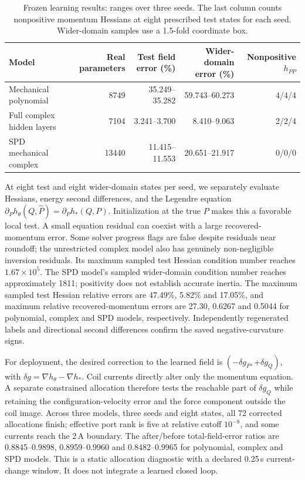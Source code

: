 \begin{table}[t]
 \centering
 \caption{Frozen learning results: ranges over three seeds. The last column counts nonpositive momentum Hessians at eight prescribed test states for each seed. Wider-domain samples use a 1.5-fold coordinate box.}
 \label{tab:learn-errors}
 \small\setlength{\tabcolsep}{3.5pt}
 \begin{tabular}{lrrrr}
 \toprule
 Model & Real parameters & Test field error (\%) & Wider-domain error (\%) & Nonpositive $h_{PP}$ \\
 \midrule
 Mechanical polynomial & 8749 & 35.249--35.282 & 59.743--60.273 & 4/4/4 \\
 Full complex hidden layers & 7104 & 3.241--3.700 & 8.410--9.063 & 2/2/4 \\
 SPD mechanical complex & 13440 & 11.415--11.553 & 20.651--21.917 & 0/0/0 \\
 \bottomrule
 \end{tabular}
\end{table}

At eight test and eight wider-domain states per seed, we separately evaluate Hessians, energy second differences, and the Legendre equation $\partial_Ph_\theta(Q,\widehat P)=\partial_Ph_*(Q,P)$. Initialization at the true $P$ makes this a favorable local test. A small equation residual can coexist with a large recovered-momentum error. Some solver progress flags are false despite residuals near roundoff; the unrestricted complex model also has genuinely non-negligible inversion residuals. Its maximum sampled test Hessian condition number reaches $1.67\times10^5$. The SPD model's sampled wider-domain condition number reaches approximately 1811; positivity does not establish accurate inertia. The maximum sampled test Hessian relative errors are 47.49\%, 5.82\% and 17.05\%, and maximum relative recovered-momentum errors are 27.30, 0.6267 and 0.5044 for polynomial, complex and SPD models, respectively. Independently regenerated labels and directional second differences confirm the saved negative-curvature signs.

For deployment, the desired correction to the learned field is $(-\delta g_P,+\delta g_Q)$, with $\delta g=\nabla h_\theta-\nabla h_*$. Coil currents directly alter only the momentum equation. A separate constrained allocation therefore tests the reachable part of $\delta g_Q$ while retaining the configuration-velocity error and the force component outside the coil image. Across three models, three seeds and eight states, all 72 corrected allocations finish; effective port rank is five at relative cutoff $10^{-8}$, and some currents reach the 2\,A boundary. The after/before total-field-error ratios are 0.8845--0.9898, 0.8959--0.9960 and 0.8482--0.9965 for polynomial, complex and SPD models. This is a static allocation diagnostic with a declared 0.25\,s current-change window. It does not integrate a learned closed loop.


